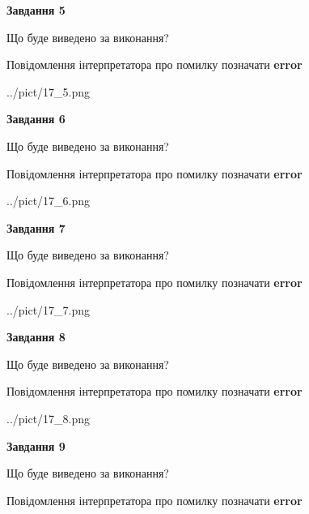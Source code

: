 \documentclass[11pt, ukrainian]{article}
\begin{document}
{\begin {large}
{\begin {center}\textbf{Завдання 5}\end {center}}\par
Що буде виведено за виконання? \par
Повідомлення інтерпретатора про помилку позначати \textbf{error}

\begin{center}
	{../pict/17_5.png}
\end{center}
\newpage

{\begin {center}\textbf{Завдання 6}\end {center}}\par
Що буде виведено за виконання? \par
Повідомлення інтерпретатора про помилку позначати \textbf{error}

\begin{center}
	{../pict/17_6.png}
\end{center}
\newpage

{\begin {center}\textbf{Завдання 7}\end {center}}\par
Що буде виведено за виконання? \par
Повідомлення інтерпретатора про помилку позначати \textbf{error}

\begin{center}
	{../pict/17_7.png}
\end{center}
\newpage

{\begin {center}\textbf{Завдання 8}\end {center}}\par
Що буде виведено за виконання? \par
Повідомлення інтерпретатора про помилку позначати \textbf{error}

\begin{center}
	{../pict/17_8.png}
\end{center}
\newpage

{\begin {center}\textbf{Завдання 9}\end {center}}\par
Що буде виведено за виконання? \par
Повідомлення інтерпретатора про помилку позначати \textbf{error}


\end{large}}
\end{document}
